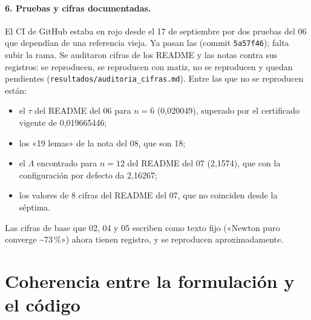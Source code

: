 \documentclass[11pt]{article}
\theoremstyle{remark}
\begin{document}
\paragraph{6. Pruebas y cifras documentadas.} El CI de GitHub estaba en rojo desde el 17 de septiembre por dos pruebas del 06 que dependían de una referencia vieja. Ya pasan las \PruebasSeis{} (commit \texttt{5a57f46}); falta subir la rama. Se auditaron \AudTotal{} cifras de los README y las notas contra sus registros: \AudSi{} se reproducen, \AudMatiz{} se reproducen con matiz, \AudNo{} no se reproducen y \AudPend{} quedan pendientes (\texttt{resultados/auditoria\_cifras.md}). Entre las que no se reproducen están:
\begin{itemize}[nosep]
\item el $\tau$ del README del 06 para $n=6$ (0,020049), superado por el certificado vigente de 0,019665446;
\item los «19 lemas» de la nota del 08, que son 18;
\item el $\Lambda$ encontrado para $n=12$ del README del 07 (2,1574), que con la configuración por defecto da 2,16267;
\item los valores de 8 cifras del README del 07, que no coinciden desde la séptima.
\end{itemize}
Las cifras de base que 02, 04 y 05 escriben como texto fijo («Newton puro converge \textasciitilde73\,\%») ahora tienen registro, y se reproducen aproximadamente.

\section{Coherencia entre la formulación y el código}\label{sec:coherencia}
\end{document}
